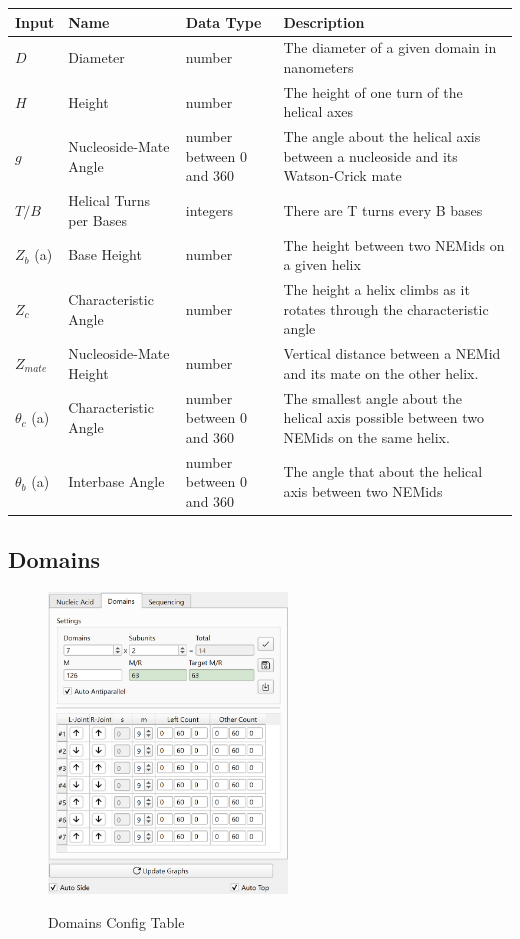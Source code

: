 \documentclass[titlepage]{article}
\begin{document}
	\begin{tabular}{|p{.5in}|p{1in}|p{.7in}|p{1.5in}|}
		\label{tab:setting-descriptions}
		\centering
		Input & Name & Data Type & Description \\
		\hline
		$D$ & Diameter & number & The diameter of a given domain in nanometers \\ \hline
		$H$ & Height & number & The height of one turn of the helical axes \\ \hline
		$g$ & Nucleoside-Mate Angle & number between 0 and 360 & The angle about the helical axis between a nucleoside and its Watson-Crick mate \\ \hline
		$T/B$ & Helical Turns per Bases & integers & There are T turns every B bases \\ \hline
		$Z_b$ (a) & Base Height & number & The height between two NEMids on a given helix \\ \hline
		$Z_c$ & Characteristic Angle & number & The height a helix climbs as it rotates through the characteristic angle \\ \hline
		$Z_{mate}$ & Nucleoside-Mate Height & number & Vertical distance between a NEMid and its mate on the other helix. \\ \hline
		$\theta_{c}$ (a) & Characteristic Angle & number between 0 and 360 & The smallest angle about the helical axis possible between two NEMids on the same helix. \\ \hline
		$\theta_{b}$ (a) & Interbase Angle & number between 0 and 360 & The angle that about the helical axis between two NEMids \\
	\end{tabular}
	
	\subsection{Domains}
	
	\begin{figure}
		\centering
		\caption{Domains Config Table}
		\includegraphics[width=2.5in]{domain-config-table.png}
		\label{fig:domain-config-table}
	\end{figure}
\end{document}
